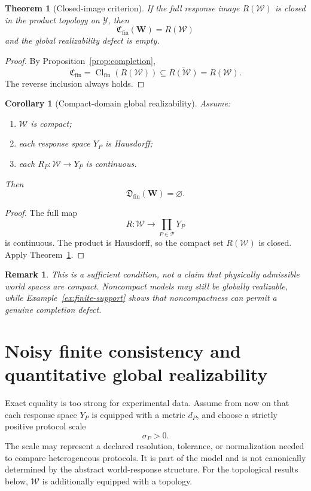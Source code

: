 \documentclass[11pt]{article}
\newtheorem{theorem}[definition]{Theorem}
\newtheorem{corollary}[definition]{Corollary}
\newtheorem{remark}[definition]{Remark}
\newcommand{\W}{\mathcal W}
\newcommand{\Pcal}{\mathcal P}
\newcommand{\Y}{\mathcal Y}
\newcommand{\Cfin}{\mathfrak C_{\mathrm{fin}}}
\newcommand{\Dfin}{\mathfrak D_{\mathrm{fin}}}
\begin{document}
\begin{theorem}[Closed-image criterion]\label{thm:closed-image}
If the full response image $R(\W)$ is closed in the product topology on $\Y$,
then
\[
\Cfin(\mathbf W)=R(\W)
\]
and the global realizability defect is empty.
\end{theorem}

\begin{proof}
By Proposition~\ref{prop:completion},
\[
\Cfin=\operatorname{Cl}_{\mathrm{fin}}(R(\W))
\subseteq
\overline{R(\W)}
=
R(\W).
\]
The reverse inclusion always holds.
\end{proof}

\begin{corollary}[Compact-domain global realizability]\label{cor:compact}
Assume:
\begin{enumerate}[label=(\roman*)]
\item $\W$ is compact;
\item each response space $Y_P$ is Hausdorff;
\item each $R_P:\W\to Y_P$ is continuous.
\end{enumerate}
Then
\[
\Dfin(\mathbf W)=\varnothing.
\]
\end{corollary}

\begin{proof}
The full map
\[
R:\W\to\prod_{P\in\Pcal}Y_P
\]
is continuous. The product is Hausdorff, so the compact set $R(\W)$ is closed.
Apply Theorem~\ref{thm:closed-image}.
\end{proof}

\begin{remark}
This is a sufficient condition, not a claim that physically admissible world
spaces are compact. Noncompact models may still be globally realizable, while
Example~\ref{ex:finite-support} shows that noncompactness can permit a genuine
completion defect.
\end{remark}


\section{Noisy finite consistency and quantitative global realizability}

Exact equality is too strong for experimental data. Assume from now on that
each response space $Y_P$ is equipped with a metric $d_P$, and choose a
strictly positive protocol scale
\[
\sigma_P>0.
\]
The scale may represent a declared resolution, tolerance, or normalization
needed to compare heterogeneous protocols. It is part of the model and is not
canonically determined by the abstract world-response structure. For the
topological results below, $\W$ is additionally equipped with a topology.
\end{document}
